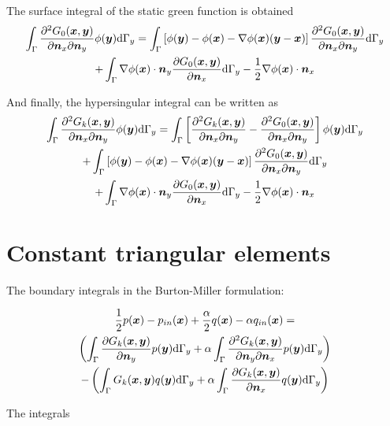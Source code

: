 \documentclass[a4paper, 10pt]{article}
\newcommand{\td}{\mathrm{d}}
\newcommand{\sx}{\bm{\mathnormal{x}}}
\newcommand{\sy}{\bm{\mathnormal{y}}}
\newcommand{\sn}{\bm{\mathnormal{n}}}
\begin{document}
The surface integral of the static green function is obtained
%
\begin{multline}
	\int_\Gamma \frac{\partial^2 G_0(\sx, \sy)}{\partial \sn_x \partial \sn_y} \phi(\sy) \td \Gamma_y
= \int_\Gamma \left[\phi(\sy) - \phi(\sx) - \nabla \phi(\sx) (\sy - \sx) \right] \frac{\partial^2 G_0(\sx, \sy)}{\partial \sn_x \partial \sn_y} \td \Gamma_y \\
	+ \int_\Gamma \nabla \phi(\sx) \cdot \sn_y \frac{\partial G_0(\sx,\sy)}{\partial \sn_x} \td \Gamma_y -\frac{1}{2} \nabla \phi(\sx) \cdot \sn_x
\end{multline}

And finally, the hypersingular integral can be written as
%
\begin{multline}
	\int_\Gamma \frac{\partial^2 G_k(\sx, \sy)}{\partial \sn_x \partial \sn_y} \phi(\sy) \td \Gamma_y = \int_\Gamma \left[\frac{\partial^2 G_k(\sx, \sy)}{\partial \sn_x \partial \sn_y} - \frac{\partial^2 G_0(\sx, \sy)}{\partial \sn_x \partial \sn_y}\right] \phi(\sy) \td \Gamma_y \\
	+ \int_\Gamma \left[\phi(\sy) - \phi(\sx) - \nabla \phi(\sx) (\sy - \sx) \right] \frac{\partial^2 G_0(\sx, \sy)}{\partial \sn_x \partial \sn_y} \td \Gamma_y \\
	+ \int_\Gamma \nabla \phi(\sx) \cdot \sn_y \frac{\partial G_0(\sx,\sy)}{\partial \sn_x} \td \Gamma_y -\frac{1}{2} \nabla \phi(\sx) \cdot \sn_x
\end{multline}

\section{Constant triangular elements}

The boundary integrals in the Burton-Miller formulation:

\begin{multline}
	\frac{1}{2} p (\sx)
	-
	p_{in}(\sx)
	+
	\frac{\alpha}{2} q(\sx)
	-
	\alpha q_{in}(\sx)
	= \\
	\left(
	\int_{\Gamma} \frac{\partial{G}_k (\sx, \sy)}{\partial \sn_y} p(\sy) \td \Gamma_y
	+
	\alpha \int_{\Gamma}
	\frac{\partial^2{G}_k (\sx, \sy)}{\partial \sn_y \partial \sn_x} p(\sy) \td \Gamma_y
	\right)
	\\
	-
	\left(
	\int_{\Gamma} G_k(\sx,\sy) q(\sy) \td \Gamma_y
	+
	\alpha \int_{\Gamma}
	\frac{\partial G_k(\sx,\sy)}{\partial \sn_x}q(\sy) \td \Gamma_y
	\right)
\end{multline}

The integrals 
%
\end{document}

